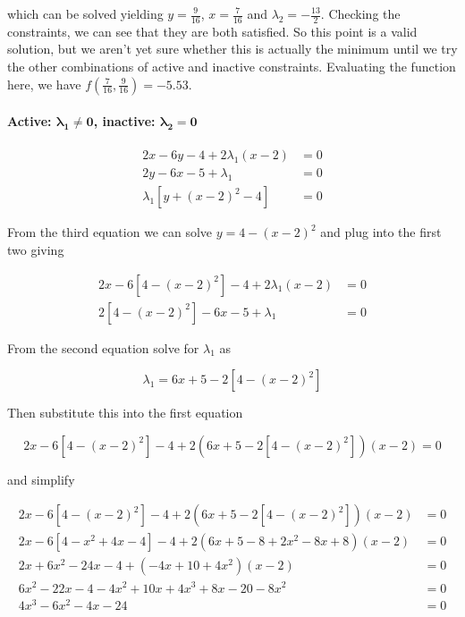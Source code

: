 \documentclass[11pt,letterpaper,onecolumn,notitlepage]{article}
\begin{document}
  which can be solved yielding $y=\frac{9}{16}$, $x=\frac{7}{16}$ and $\lambda_{2}=-\frac{13}{2}$.
  Checking the constraints, we can see that they are both satisfied.
  So this point is a valid solution, but we aren't yet sure whether this is actually the minimum until we try the other combinations of active and inactive constraints.
  Evaluating the function here, we have $f\left(\frac{7}{16},\frac{9}{16}\right)=-5.53$.

  \paragraph{Active: $\boldsymbol{\lambda_{1}\neq0}$, inactive: $\boldsymbol{\lambda_{2}=0}$}

  \begin{align*}
  2x-6y-4+2\lambda_{1}(x-2)&=0 \\
  2y-6x-5+\lambda_{1}&=0 \\
  \lambda_{1}\left[y+(x-2)^{2}-4\right]&=0
  \end{align*}

  From the third equation we can solve $y=4-(x-2)^{2}$ and plug into the first two giving

  \begin{align*}
    2x-6\left[4-(x-2)^{2}\right]-4+2\lambda_{1}(x-2)&=0 \\
    2\left[4-(x-2)^{2}\right]-6x-5+\lambda_{1}&=0
  \end{align*}

  From the second equation solve for $\lambda_{1}$ as

  \begin{equation*}
    \lambda_{1}=6x+5-2\left[4-(x-2)^{2}\right]
  \end{equation*}

  Then substitute this into the first equation

  \begin{equation*}
    2x-6\left[4-(x-2)^{2}\right]-4+2\left(6x+5-2\left[4-(x-2)^{2}\right]\right)(x-2)=0
  \end{equation*}

  and simplify

  \begin{align*}
    2x-6\left[4-(x-2)^{2}\right]-4+2\left(6x+5-2\left[4-(x-2)^{2}\right]\right)(x-2)  &= 0 \\
    2x-6\left[4-x^{2}+4x-4\right]-4+2\left(6x+5-8+2x^{2}-8x+8\right)(x-2)             &= 0 \\
    2x+6x^{2}-24x-4+(-4x+10+4x^{2})(x-2)                                              &= 0 \\
    6x^{2}-22x-4-4x^{2}+10x+4x^{3}+8x-20-8x^{2}                                       &= 0 \\
    4x^{3}-6x^{2}-4x-24                                                               &= 0
  \end{align*}
\end{document}
